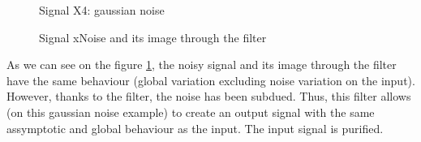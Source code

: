 \documentclass[a4paper,10pt]{article}
\begin{document}
	\begin{figure}[!htb]\centering
	  \begin{minipage}{0.45\textwidth}
	    \caption{Signal X4: gaussian noise }\label{signal X4}
	  \end{minipage}
	  \begin{minipage}{0.45\textwidth}
	    \caption{Signal xNoise and its image through the filter}\label{xNoise and S(xNoise)}
	  \end{minipage}
	\end{figure}
	As we can see on the figure \ref{xNoise and S(xNoise)}, the noisy signal and its image through the filter have the same behaviour (global variation excluding noise variation on the input).  
	However, thanks to the filter, the noise has been subdued.   Thus, this filter allows (on this gaussian noise example) to create an output signal with the same assymptotic and global behaviour as the input.  The input signal is purified.
	
\end{document}
